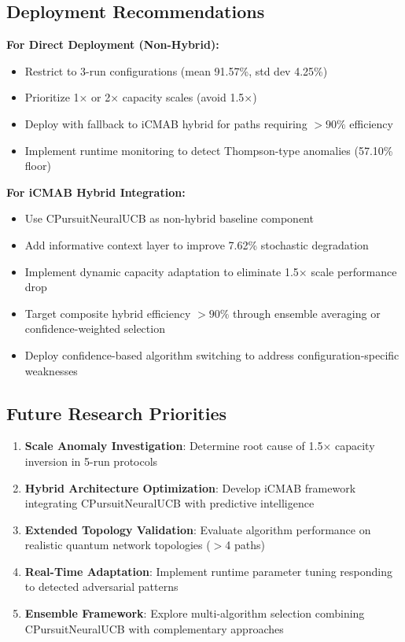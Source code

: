 \documentclass[12pt,a4paper]{article}
\newcommand{\primarytext}[1]{\textcolor{primaryblue}{\textbf{#1}}}
\newcommand{\secondarytext}[1]{\textcolor{secondaryblue}{\textbf{#1}}}
\newcommand{\success}[1]{\textcolor{accentgreen}{\textbf{#1}}}
\begin{document}
\subsection{Deployment Recommendations}

\textbf{For Direct Deployment (Non-Hybrid):}
\begin{itemize}
\item Restrict to 3-run configurations (mean 91.57\%, std dev 4.25\%)
\item Prioritize 1× or 2× capacity scales (avoid 1.5×)
\item Deploy with fallback to iCMAB hybrid for paths requiring $>90\%$ efficiency
\item Implement runtime monitoring to detect Thompson-type anomalies (57.10\% floor)
\end{itemize}

\textbf{For iCMAB Hybrid Integration:}
\begin{itemize}
\item Use CPursuitNeuralUCB as non-hybrid baseline component
\item Add informative context layer to improve 7.62\% stochastic degradation
\item Implement dynamic capacity adaptation to eliminate 1.5× scale performance drop
\item Target composite hybrid efficiency $>90\%$ through ensemble averaging or confidence-weighted selection
\item Deploy confidence-based algorithm switching to address configuration-specific weaknesses
\end{itemize}

\subsection{Future Research Priorities}

\begin{enumerate}
\item \primarytext{Scale Anomaly Investigation}: Determine root cause of 1.5× capacity inversion in 5-run protocols
\item \success{Hybrid Architecture Optimization}: Develop iCMAB framework integrating CPursuitNeuralUCB with predictive intelligence
\item \secondarytext{Extended Topology Validation}: Evaluate algorithm performance on realistic quantum network topologies ($>$4 paths)
\item \primarytext{Real-Time Adaptation}: Implement runtime parameter tuning responding to detected adversarial patterns
\item \success{Ensemble Framework}: Explore multi-algorithm selection combining CPursuitNeuralUCB with complementary approaches
\end{enumerate}
\end{document}

